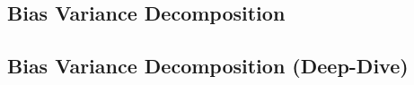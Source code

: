 %

%


\subsection{Bias Variance Decomposition}


\subsection{Bias Variance Decomposition (Deep-Dive)}



